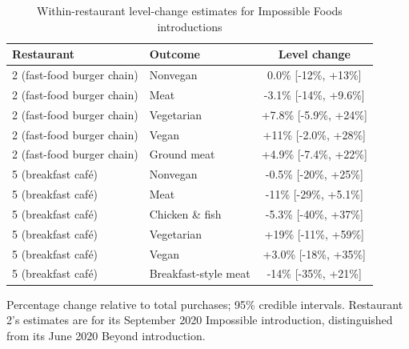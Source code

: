 \begin{table}[H]
\centering
\caption{Within-restaurant level-change estimates for Impossible Foods introductions}
\label{tab:impossible_estimates}
\begin{tabular}{llc}
\toprule
Restaurant & Outcome & Level change \\
\midrule
2 (fast-food burger chain) & Nonvegan & 0.0\% [-12\%, +13\%] \\
2 (fast-food burger chain) & Meat & -3.1\% [-14\%, +9.6\%] \\
2 (fast-food burger chain) & Vegetarian & +7.8\% [-5.9\%, +24\%] \\
2 (fast-food burger chain) & Vegan & +11\% [-2.0\%, +28\%] \\
2 (fast-food burger chain) & Ground meat & +4.9\% [-7.4\%, +22\%] \\
5 (breakfast café) & Nonvegan & -0.5\% [-20\%, +25\%] \\
5 (breakfast café) & Meat & -11\% [-29\%, +5.1\%] \\
5 (breakfast café) & Chicken \& fish & -5.3\% [-40\%, +37\%] \\
5 (breakfast café) & Vegetarian & +19\% [-11\%, +59\%] \\
5 (breakfast café) & Vegan & +3.0\% [-18\%, +35\%] \\
5 (breakfast café) & Breakfast-style meat & -14\% [-35\%, +21\%] \\
\bottomrule
\end{tabular}
\par\smallskip\footnotesize Percentage change relative to total purchases; 95\% credible intervals. Restaurant 2's estimates are for its September 2020 Impossible introduction, distinguished from its June 2020 Beyond introduction.
\end{table}
